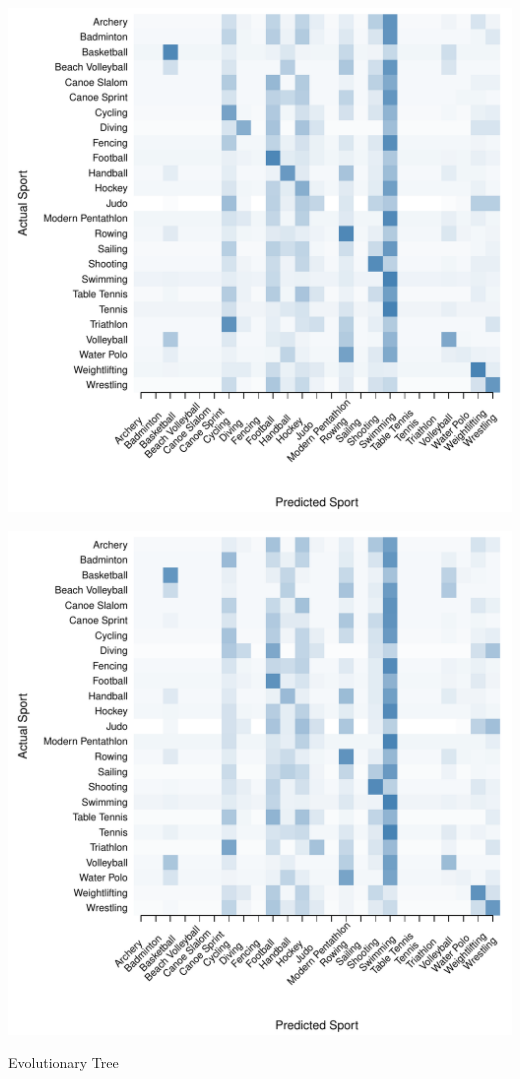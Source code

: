 \documentclass[landscape, paperwidth=42in, paperheight=36in,
fontscale=.35, margin=1in]{baposter}
\begin{document}
\begin{poster}
{\begin{center}
  \begin{minipage}{0.45\textwidth}
    \begin{center}
      \includegraphics[scale=0.27]{../graphics/sportEV-trn.pdf}
    \end{center}
  \end{minipage}
  \hspace{0.05\textwidth}
  \begin{minipage}{0.45\textwidth}
    \begin{center}
      \includegraphics[scale=0.27]{../graphics/sportEV-tst.pdf}
    \end{center}
  \end{minipage}
  Evolutionary Tree \\




\end{center}}
\end{poster}
\end{document}
